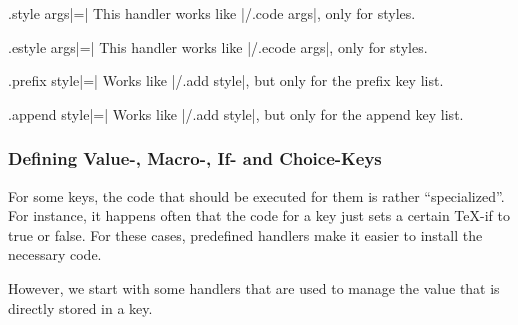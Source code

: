 \begin{handler}{{.style args}|=|}
    This handler works like |/.code args|, only for styles.
\end{handler}

\begin{handler}{{.estyle args}|=|}
    This handler works like |/.ecode args|, only for styles.
\end{handler}

\begin{handler}{{.prefix style}|=|}
    Works like |/.add style|, but only for the prefix key list.
\end{handler}

\begin{handler}{{.append style}|=|}
    Works like |/.add style|, but only for the append key list.
\end{handler}


\subsubsection{Defining Value-, Macro-, If- and Choice-Keys}

For some keys, the code that should be executed for them is rather
``specialized''. For instance, it happens often that the code for a key just
sets a certain \TeX-if to true or false. For these cases, predefined handlers
make it easier to install the necessary code.

However, we start with some handlers that are used to manage the value that is
directly stored in a key.

